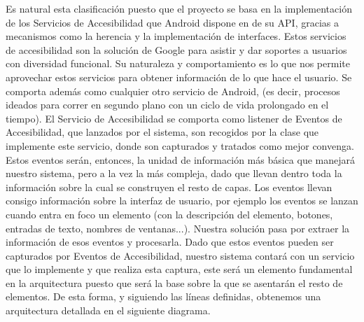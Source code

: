 \documentclass[12pt,a4paper,oneside]{book} %
\begin{document}
Es natural esta clasificación puesto que el proyecto se basa en la implementación de los Servicios de Accesibilidad que Android dispone en de su API, gracias a mecanismos como la herencia y la implementación de interfaces. 
\newline \newline
Estos servicios de accesibilidad son la solución de Google para asistir y dar soportes a usuarios con diversidad funcional. Su naturaleza y comportamiento es lo que nos permite aprovechar estos servicios para obtener información de lo que hace el usuario. 
\newline \newline
Se comporta además como cualquier otro servicio de Android, (es decir, procesos ideados para correr en segundo plano con un ciclo de vida prolongado en el tiempo). El Servicio de Accesibilidad se comporta como listener de Eventos de Accesibilidad, que lanzados por el sistema, son recogidos por la clase que implemente este servicio, donde son capturados y tratados como mejor convenga. Estos eventos serán, entonces, la unidad de información más básica que manejará nuestro sistema, pero a la vez la más compleja, dado que llevan dentro toda la información sobre la cual se construyen el resto de capas.
\newline \newline
Los eventos llevan consigo información sobre la interfaz de usuario, por ejemplo los eventos se lanzan cuando entra en foco un elemento (con la descripción del elemento, botones, entradas de texto, nombres de ventanas...). Nuestra solución pasa por extraer la información de esos eventos y procesarla. 
\newline \newline
Dado que estos eventos pueden ser capturados por Eventos de Accesibilidad, nuestro sistema contará con un servicio que lo implemente y que realiza esta captura, este será un elemento fundamental en la arquitectura puesto que será la base sobre la que se asentarán el resto de elementos. 
\newline \newline 
De esta forma, y siguiendo las líneas definidas, obtenemos una arquitectura detallada en el siguiente diagrama. 
\end{document}
